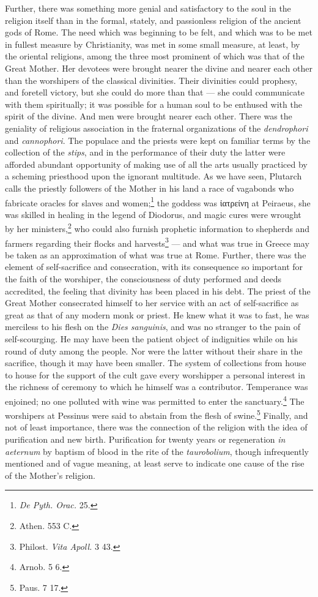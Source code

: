 \documentclass[a4paper, 11pt, oneside, polutonikogreek, french]{article}
\begin{document}
Further, there was something more genial and satisfactory to the soul in the religion itself than in the formal, stately, and passionless religion of the ancient gods of Rome. The need which was beginning to be felt, and which was to be met in fullest measure by Christianity, was met in some small measure, at least, by the oriental religions, among the three most prominent of which was that of the Great Mother. Her devotees were brought nearer the divine and nearer each other than the worshipers of the classical divinities. Their divinities could prophesy, and foretell victory, but she could do more than that --- she could communicate with them spiritually; it was possible for a human soul to be enthused with the spirit of the divine. And men were brought nearer each other. There was the geniality of religious association in the fraternal organizations of the \emph{dendrophori} and \emph{cannophori}. The populace and the priests were kept on familiar terms by the collection of the \emph{stips}, and in the performance of their duty the latter were afforded abundant opportunity of making use of all the arts usually practiced by a scheming priesthood upon the ignorant multitude. As we have seen, Plutarch calls the priestly followers of the Mother in his land a race of vagabonds who fabricate oracles for slaves and women;\footnote{\emph{De Pyth. Orac.} 25.} the goddess was ἰατρείνη at Peiraeus, she was skilled in healing in the legend of Diodorus, and magic cures were wrought by her ministers,\footnote{Athen. 553 C.} who could also furnish prophetic information to shepherds and farmers regarding their flocks and harvests\footnote{Philost. \emph{Vita Apoll.} 3 43.} --- and what was true in Greece may be taken as an approximation of what was true at Rome. Further, there was the element of self-sacrifice and consecration, with its consequence so important for the faith of the worshiper, the consciousness of duty performed and deeds accredited, the feeling that divinity has been placed in his debt. The priest of the Great Mother consecrated himself to her service with an act of self-sacrifice as great as that of any modern monk or priest. He knew what it was to fast, he was merciless to his flesh on the \emph{Dies sanguinis}, and was no stranger to the pain of self-scourging. He may have been the patient object of indignities while on his round of duty among the people. Nor were the latter without their share in the sacrifice, though it may have been smaller. The system of collections from house to house for the support of the cult gave every worshipper a personal interest in the richness of ceremony to which he himself was a contributor. Temperance was enjoined; no one polluted with wine was permitted to enter the sanctuary.\footnote{Arnob. 5 6.} The worshipers at Pessinus were said to abstain from the flesh of swine.\footnote{Paus. 7 17.} Finally, and not of least importance, there was the connection of the religion with the idea of purification and new birth. Purification for twenty years or regeneration \emph{in aeternum} by baptism of blood in the rite of the \emph{taurobolium}, though infrequently mentioned and of vague meaning, at least serve to indicate one cause of the rise of the Mother's religion.
\end{document}
